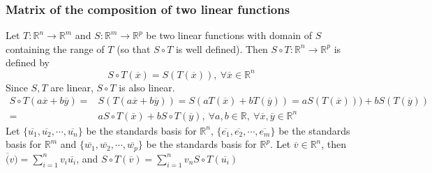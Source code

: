 \subsubsection{Matrix of the composition of two linear functions}
	Let $T : \mathbb{R}^n \to \mathbb{R}^m$ and $S : \mathbb{R}^m \to \mathbb{R}^p$ be two linear functions with domain of $S$ containing the range of $T$ (so that $S \circ T$ is well defined). Then $S \circ T : \mathbb{R}^n \to \mathbb{R}^p$ is defined by
	\[ S \circ T(\overline{x}) = S(T(\overline{x})),\ \forall \overline{x} \in \mathbb{R}^n\]
	Since $S,T$ are linear, $S \circ T$ is also linear.
	\begin{align*}
		S \circ T(a \overline{x} + b \overline{y}) = & S(T(a \overline{x} + b\overline{y})) = S(a T(\overline{x}) + b T(\overline{y})) = a S(T(\overline{x}))) + b S(T(\overline{y})) \\
		= & a S \circ T(\overline{x}) + b S \circ T(\overline{y}),\ \forall a,b \in \mathbb{R},\ \forall \overline{x},\overline{y} \in \mathbb{R}^n
	\end{align*}
	Let $\{\overline{u_1},\overline{u_2},\cdots,\overline{u_n}\}$ be the standards basis for $\mathbb{R}^n$, $\{\overline{e_1},\overline{e_2},\cdots,\overline{e_m}\}$ be the standards basis for $\mathbb{R}^m$ and $\{\overline{w_1},\overline{w_2},\cdots,\overline{w_p}\}$ be the standards basis for $\mathbb{R}^p$. Let $\overline{v} \in \mathbb{R}^n$, then $\overline(v) = \sum_{i=1}^n v_i\overline{u_i}$, and $S \circ T(\overline{v})=\sum_{i=1}^n v_n S \circ T(\overline{u_i})$
